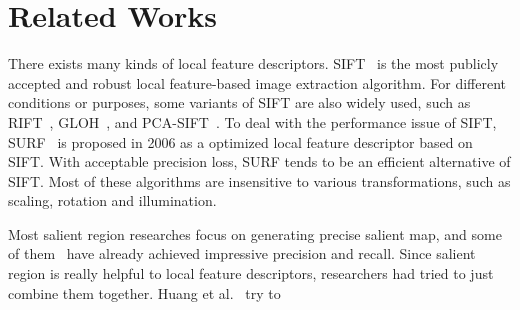 \section{Related Works}

There exists many kinds of local feature descriptors. SIFT~\cite{lowe1999object}\cite{lowe2004distinctive} is the most publicly accepted and robust local feature-based image extraction algorithm. For different conditions or purposes, some variants of SIFT are also widely used, such as RIFT~\cite{lazebnik2005sparse}, GLOH~\cite{mikolajczyk2005performance}, and PCA-SIFT~\cite{ke2004pca}. To deal with the performance issue of SIFT, SURF~\cite{Bay2006SURF} is proposed in 2006 as a optimized local feature descriptor based on SIFT. With acceptable precision loss, SURF tends to be an efficient alternative of SIFT. Most of these algorithms are insensitive to various transformations, such as scaling, rotation and illumination.

Most salient region researches focus on generating precise salient map, and some of them~\cite{cheng2011global,achanta2009frequency} have already achieved impressive precision and recall. Since salient region is really helpful to local feature descriptors, researchers had tried to just combine them together. Huang et al.~\cite{huang2009image} try to 